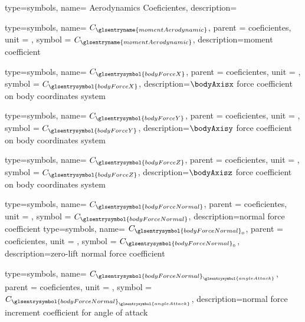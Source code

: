 {type=symbols,
    name= {Aerodynamics Coeficientes},
    description={}
}

{type=symbols,
    name= \ensuremath{C_{\glsentryname{momentAerodynamic}}},
    parent = {coeficientes},
    unit = \unexpanded{},
    symbol = \ensuremath{C_{\glsentryname{momentAerodynamic}}},
    description={moment coefficient}
}

{type=symbols,
    name= \ensuremath{C_{\glsentrysymbol{bodyForceX}}},
    parent = {coeficientes},
    unit = \unexpanded{},
    symbol = \ensuremath{C_{\glsentrysymbol{bodyForceX}}},
    description={$\bodyAxisx$ force coefficient on body coordinates system }
}

{type=symbols,
    name= \ensuremath{C_{\glsentrysymbol{bodyForceY}}},
    parent = {coeficientes},
    unit = \unexpanded{},
    symbol = \ensuremath{C_{\glsentrysymbol{bodyForceY}}},
    description={$\bodyAxisy$ force coefficient on body coordinates system }
}

{type=symbols,
    name= \ensuremath{C_{\glsentrysymbol{bodyForceZ}}},
    parent = {coeficientes},
    unit = \unexpanded{},
    symbol = \ensuremath{C_{\glsentrysymbol{bodyForceZ}}},
    description={$\bodyAxisz$ force coefficient on body coordinates system }
}

{type=symbols,
    name= \ensuremath{C_{\glsentrysymbol{bodyForceNormal}}},
    parent = {coeficientes},
    unit = \unexpanded{},
    symbol = \ensuremath{C_{\glsentrysymbol{bodyForceNormal}}},
    description={normal force coefficient}
}
{type=symbols,
    name= \ensuremath{C_{\glsentrysymbol{bodyForceNormal}_{0}}},
    parent = {coeficientes},
    unit = \unexpanded{},
    symbol = \ensuremath{C_{\glsentrysymbol{bodyForceNormal}_{0}}},
    description={zero-lift normal force coefficient}
}

{type=symbols,
    name= \ensuremath{C_{{\glsentrysymbol{bodyForceNormal}}_{\glsentrysymbol{angleAttack}}}},
    parent = {coeficientes},
    unit = \unexpanded{},
    symbol = \ensuremath{C_{{\glsentrysymbol{bodyForceNormal}}_{\glsentrysymbol{angleAttack}}}},
    description={normal force increment coefficient for angle of attack}
}




